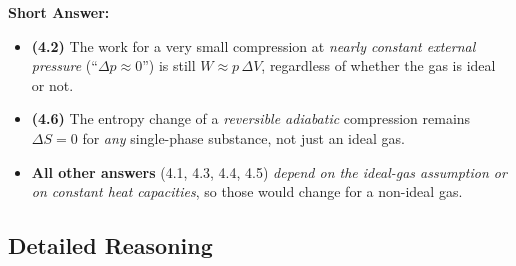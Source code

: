 \documentclass[12pt]{article}
\theoremstyle{definition} %
\theoremstyle{plain} %
\begin{document}
\vspace{1em}
\noindent
\textbf{Short Answer:}
\begin{itemize}
  \item \textbf{(4.2)} The work for a very small compression at \emph{nearly constant external pressure} (``$\Delta p \approx 0$'') is still $W \approx p\,\Delta V$, regardless of whether the gas is ideal or not.
  \item \textbf{(4.6)} The entropy change of a \emph{reversible adiabatic} compression remains $\Delta S=0$ for \emph{any} single-phase substance, not just an ideal gas.
  \item \textbf{All other answers} (4.1, 4.3, 4.4, 4.5) \emph{depend on the ideal-gas assumption or on constant heat capacities}, so those would change for a non-ideal gas.
\end{itemize}

\subsection*{Detailed Reasoning}
\end{document}
